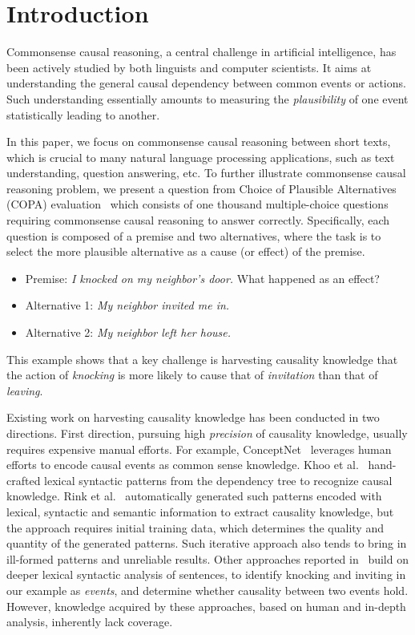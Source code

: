 \section{Introduction}
\label{sec:intro}

Commonsense causal reasoning, a central challenge in artificial intelligence,
has been actively studied by both linguists and computer scientists.
It aims at understanding the general causal dependency
between common events or actions.
Such understanding essentially amounts to measuring the {\em plausibility} of
one event statistically leading to another.

In this paper, we focus on commonsense causal reasoning between short texts,
which is crucial to many natural language processing applications,
such as text understanding, question answering, etc.
To further illustrate commonsense causal reasoning problem,
we present a question from Choice of Plausible Alternatives (COPA)
evaluation~\cite{roemmele2011choice}
which consists of one thousand multiple-choice questions requiring
commonsense causal reasoning to answer correctly.
Specifically, each question is composed of a premise and two
alternatives, where the task is to select the more plausible
alternative as a cause (or effect) of the premise.

\begin{example}
\label{ex:copa}
\noindent
\begin{itemize}
\item[] Premise: \emph{I knocked on my neighbor's door.} What
happened as an effect?
\item[] Alternative 1: \emph{My neighbor invited me in.}
\item[] Alternative 2: \emph{My neighbor left her house.}
\end{itemize}
\end{example}

This example shows that a key challenge is
harvesting causality knowledge that the action of
{\em knocking} is more likely to cause that of {\em invitation}
than that of {\em leaving}.

Existing work on harvesting causality knowledge has been conducted in
two directions.
First direction, pursuing high {\em precision} of
causality knowledge, usually requires expensive manual efforts.
For example, ConceptNet~\cite{HavasiSALAM10} leverages human efforts
to encode causal events as common sense knowledge.
Khoo et al.~ hand-crafted
lexical syntactic patterns from the dependency tree to recognize
causal knowledge.  Rink et al.~
automatically generated such patterns encoded with
lexical, syntactic and semantic information to extract
causality knowledge, but the approach requires initial training data,
which determines the quality and quantity of the generated patterns.
Such iterative approach also tends to bring in ill-formed patterns
and unreliable results.
Other approaches reported in~\cite{gordon2012copa} build on deeper
lexical syntactic analysis of sentences,
to identify knocking and inviting in our example as
\emph{events}, and determine whether causality between two events hold.
However, knowledge acquired by these approaches,
based on human and in-depth analysis, inherently lack coverage.

